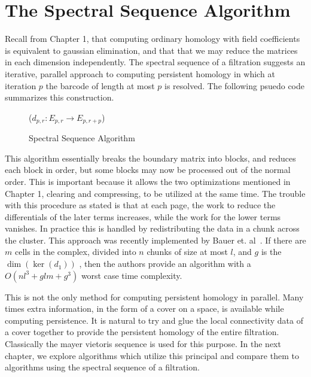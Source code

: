 \section{The Spectral Sequence Algorithm}
\label{sec:persistence-algorithm}
Recall from Chapter 1, that computing ordinary homology with field coefficients is equivalent to gaussian elimination, and that that we may reduce the matrices in each dimension independently. The spectral sequence of a filtration suggests an iterative, parallel approach to computing persistent homology in which at iteration $p$ the barcode of length at most $p$ is resolved. The following psuedo code summarizes this construction.
\begin{figure}
\begin{codebox}
\li {}  
\li \Do
\li {} 
\li \Do
\li  {}($d_{p,r} : E_{p,r} \rightarrow E_{p,r+p}$)
\End
\End
\end{codebox}
\caption{Spectral Sequence Algorithm}
\label{alg:ss-alg}
\end{figure}
This algorithm essentially breaks the boundary matrix into blocks, and reduces each block in order, but some blocks may now be processed out of the normal order. This is important
because it allows the two optimizations mentioned in Chapter 1, clearing and compressing, to be utilized at the same time. The trouble with this procedure as stated is that at each page, the work to reduce the differentials of the later terms increases, while the work for the lower terms vanishes. In practice this is handled by redistributing the data in a chunk across the cluster.  This approach was recently implemented by Bauer et. al~\cite{bkr-cccph-13}. If there are $m$ cells in the complex, divided into $n$ chunks of size at most $l$, and $g$ is the $\dim(\ker(d_1))$ , then the authors provide an algorithm with a $O(nl^3 + glm + g^3)$ worst case time complexity. 

This is not the only method for computing persistent homology in parallel. Many times extra information, in the form of a cover on a space, is available while computing persistence. It is natural to try and glue the local connectivity data of a cover together to provide the persistent homology of the entire filtration. Classically the mayer vietoris sequence is used for this purpose. In the next chapter, we explore algorithms which utilize this principal and compare them to algorithms using the spectral sequence of a filtration.  